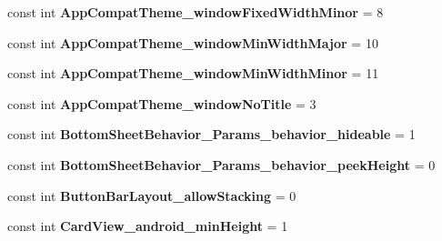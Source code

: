 \begin{DoxyCompactItemize}
const int {\bfseries App\+Compat\+Theme\+\_\+window\+Fixed\+Width\+Minor} = 8
\item 
\mbox{\label{class_pinned_app_1_1_droid_1_1_resource_1_1_styleable_a7d35d055db40ffc9a0a7b787e08721cd}} 
const int {\bfseries App\+Compat\+Theme\+\_\+window\+Min\+Width\+Major} = 10
\item 
\mbox{\label{class_pinned_app_1_1_droid_1_1_resource_1_1_styleable_a4fee0f220c84a4ecc79ea251ff54d973}} 
const int {\bfseries App\+Compat\+Theme\+\_\+window\+Min\+Width\+Minor} = 11
\item 
\mbox{\label{class_pinned_app_1_1_droid_1_1_resource_1_1_styleable_a0b131355fa2cdc9ae29cf60ad558bc87}} 
const int {\bfseries App\+Compat\+Theme\+\_\+window\+No\+Title} = 3
\item 
\mbox{\label{class_pinned_app_1_1_droid_1_1_resource_1_1_styleable_a764a4475aa51ce342ac703d03a31db03}} 
const int {\bfseries Bottom\+Sheet\+Behavior\+\_\+\+Params\+\_\+behavior\+\_\+hideable} = 1
\item 
\mbox{\label{class_pinned_app_1_1_droid_1_1_resource_1_1_styleable_a620fba532c71973d904a3801dd33a65b}} 
const int {\bfseries Bottom\+Sheet\+Behavior\+\_\+\+Params\+\_\+behavior\+\_\+peek\+Height} = 0
\item 
\mbox{\label{class_pinned_app_1_1_droid_1_1_resource_1_1_styleable_a56fa9fd18edc2ba90a67449bfff60629}} 
const int {\bfseries Button\+Bar\+Layout\+\_\+allow\+Stacking} = 0
\item 
\mbox{\label{class_pinned_app_1_1_droid_1_1_resource_1_1_styleable_a9019a01c7c9f162202c83b0d654bf055}} 
const int {\bfseries Card\+View\+\_\+android\+\_\+min\+Height} = 1
\item 
\mbox{\label{class_pinned_app_1_1_droid_1_1_resource_1_1_styleable_ab2e5cd5bdf450da7ff7d3f1843510f40}} 

\end{DoxyCompactItemize}
